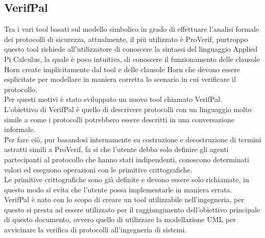 \subsection{VerifPal}
Tra i vari tool basati sul modello simbolico in grado di effettuare l'analisi formale dei protocolli di sicurezza, attualmente, il più utilizzato è ProVerif, purtroppo questo tool richiede all'utilizzatore di conoscere la sintassi del linguaggio Applied Pi Calculus, la quale è poco intuitiva, di conoscere il funzionamento delle clausole Horn create implicitamente dal tool e delle clausole Horn che devono essere esplicitate per modellare in maniera corretta lo scenario in cui verificare il protocollo.\\
Per questi motivi è stato sviluppato un nuovo tool chiamato VerifPal.\\
L'obiettivo di VerifPal è quello di descrivere protocolli con un linguaggio molto simile a come i protocolli potrebbero essere descritti in una conversazione informale.\\
Per fare ciò, pur basandosi internamente su costruzione e decostruzione di termini astratti simili a ProVerif, fa si che l'utente debba solo definire gli agenti partecipanti al protocollo che hanno stati indipendenti, conoscono determinati valori ed eseguono operazioni con le primitive crittografiche.\\
Le primitive crittografiche sono già definite e devono essere solo richiamate, in questo modo si evita che l'utente possa implementarle in maniera errata.\\
VerifPal \`e nato con lo scopo di creare un tool utilizzabile nell'ingegneria, per questo si presta ad essere utilizzato per il raggiungimento dell'obiettivo principale di questo documento, ovvero quello di utilizzare la modellazione UML per avvicinare la verifica di protocolli all'ingegneria di sistemi.  

